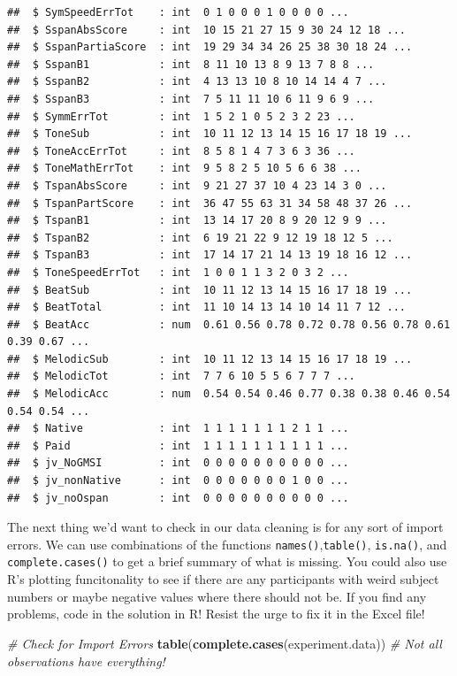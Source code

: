 \documentclass[]{book}
\newenvironment{Shaded}{\begin{snugshade}}{\end{snugshade}}
\newcommand{\KeywordTok}[1]{\textcolor[rgb]{0.13,0.29,0.53}{\textbf{#1}}}
\newcommand{\CommentTok}[1]{\textcolor[rgb]{0.56,0.35,0.01}{\textit{#1}}}
\newcommand{\NormalTok}[1]{#1}
\theoremstyle{definition}
\theoremstyle{definition}
\theoremstyle{definition}
\theoremstyle{remark}
\begin{document}
\begin{verbatim}
##  $ SymSpeedErrTot    : int  0 1 0 0 0 1 0 0 0 0 ...
##  $ SspanAbsScore     : int  10 15 21 27 15 9 30 24 12 18 ...
##  $ SspanPartiaScore  : int  19 29 34 34 26 25 38 30 18 24 ...
##  $ SspanB1           : int  8 11 10 13 8 9 13 7 8 8 ...
##  $ SspanB2           : int  4 13 13 10 8 10 14 14 4 7 ...
##  $ SspanB3           : int  7 5 11 11 10 6 11 9 6 9 ...
##  $ SymmErrTot        : int  1 5 2 1 0 5 2 3 2 23 ...
##  $ ToneSub           : int  10 11 12 13 14 15 16 17 18 19 ...
##  $ ToneAccErrTot     : int  8 5 8 1 4 7 3 6 3 36 ...
##  $ ToneMathErrTot    : int  9 5 8 2 5 10 5 6 6 38 ...
##  $ TspanAbsScore     : int  9 21 27 37 10 4 23 14 3 0 ...
##  $ TspanPartScore    : int  36 47 55 63 31 34 58 48 37 26 ...
##  $ TspanB1           : int  13 14 17 20 8 9 20 12 9 9 ...
##  $ TspanB2           : int  6 19 21 22 9 12 19 18 12 5 ...
##  $ TspanB3           : int  17 14 17 21 14 13 19 18 16 12 ...
##  $ ToneSpeedErrTot   : int  1 0 0 1 1 3 2 0 3 2 ...
##  $ BeatSub           : int  10 11 12 13 14 15 16 17 18 19 ...
##  $ BeatTotal         : int  11 10 14 13 14 10 14 11 7 12 ...
##  $ BeatAcc           : num  0.61 0.56 0.78 0.72 0.78 0.56 0.78 0.61 0.39 0.67 ...
##  $ MelodicSub        : int  10 11 12 13 14 15 16 17 18 19 ...
##  $ MelodicTot        : int  7 7 6 10 5 5 6 7 7 7 ...
##  $ MelodicAcc        : num  0.54 0.54 0.46 0.77 0.38 0.38 0.46 0.54 0.54 0.54 ...
##  $ Native            : int  1 1 1 1 1 1 1 2 1 1 ...
##  $ Paid              : int  1 1 1 1 1 1 1 1 1 1 ...
##  $ jv_NoGMSI         : int  0 0 0 0 0 0 0 0 0 0 ...
##  $ jv_nonNative      : int  0 0 0 0 0 0 0 1 0 0 ...
##  $ jv_noOspan        : int  0 0 0 0 0 0 0 0 0 0 ...
\end{verbatim}

The next thing we'd want to check in our data cleaning is for any sort
of import errors. We can use combinations of the functions
\texttt{names()},\texttt{table()}, \texttt{is.na()}, and
\texttt{complete.cases()} to get a brief summary of what is missing. You
could also use R's plotting funcitonality to see if there are any
participants with weird subject numbers or maybe negative values where
there should not be. If you find any problems, code in the solution in
R! Resist the urge to fix it in the Excel file!

\begin{Shaded}
\begin{Highlighting}[]
\CommentTok{# Check for Import Errors }
\KeywordTok{table}\NormalTok{(}\KeywordTok{complete.cases}\NormalTok{(experiment.data)) }\CommentTok{# Not all observations have everything! }
\end{Highlighting}
\end{Shaded}
\end{document}
